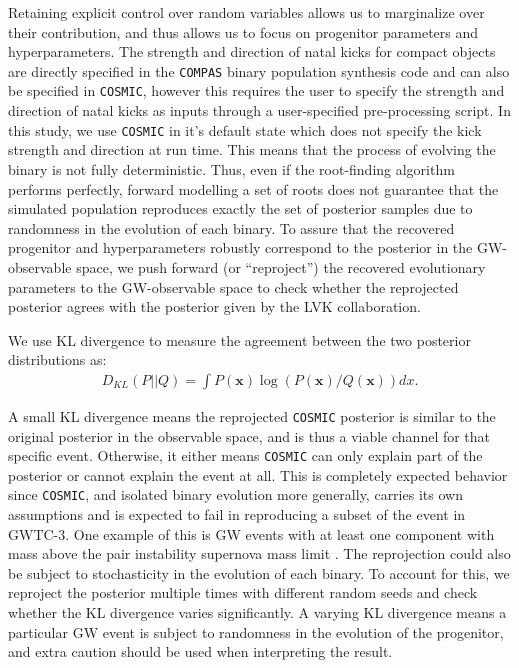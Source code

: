 \documentclass[linenumbers,twocolumn]{aastex631}
\begin{document}
Retaining explicit control over random variables allows us to marginalize over
their contribution, and thus allows us to focus on progenitor parameters and
hyperparameters. The strength and direction of natal kicks for compact objects 
are directly specified in the \texttt{COMPAS} binary population synthesis code 
\citep{Riley2022} and can also be specified in \texttt{COSMIC}, however 
this requires the user to specify the strength and direction of natal kicks as 
inputs through a user-specified pre-processing script.  In this study, we use 
\texttt{COSMIC} in it's default state which does not specify the kick strength 
and direction at run time. %
This means that the process of evolving the binary
is not fully deterministic. Thus, even if the root-finding algorithm performs
perfectly, forward modelling a set of roots does not guarantee that the
simulated population reproduces exactly the set of posterior samples due to
randomness in the evolution of each binary. To assure that the recovered
progenitor and hyperparameters robustly correspond to the posterior in the
GW-observable space, we push forward (or ``reproject'') the recovered
evolutionary parameters to the GW-observable space to check whether the
reprojected posterior agrees with the posterior given by the LVK collaboration.

We use KL divergence to measure the agreement between the two posterior
distributions as:
\begin{align}
D_{KL}(P||Q) = \int P(\bm{x}) \log(P(\bm{x})/Q(\bm{x})) dx.
\label{eq:KLdivergence}
\end{align}

\noindent A small KL divergence means the reprojected \texttt{COSMIC} posterior
is similar to the original posterior in the observable space, and is thus a
viable channel for that specific event. Otherwise, it either means
\texttt{COSMIC} can only explain part of the posterior or cannot explain the
event at all. This is completely expected behavior since \texttt{COSMIC}, and
isolated binary evolution more generally, carries its own assumptions and is
expected to fail in reproducing a subset of the event in GWTC-3. One example of
this is GW events with at least one component with mass above the pair
instability supernova mass limit \citep{Woosley2017, Farmer2019}. The
reprojection could also be subject to stochasticity in the evolution of each
binary. To account for this, we reproject the posterior multiple times with
different random seeds and check whether the KL divergence varies significantly.
A varying KL divergence means a particular GW event is subject to randomness in
the evolution of the progenitor, and extra caution should be used when
interpreting the result.
\end{document}
